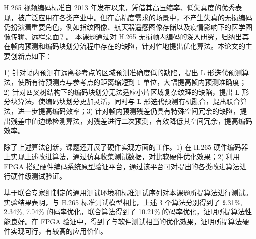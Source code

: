 \begin{cabstract}
    H.265 视频编码标准自 2013 年发布以来，凭借其高压缩率、低失真度的优秀表现，被广泛应用在各类产业中。但在高精度需求的场景中，不产生失真的无损编码仍扮演着重要角色，例如指纹图像、航天器遥感图像存储以及疫情影响下的医学图像传输、远程桌面等。    
    本课题通过对 H.265 无损帧内编码的深入研究，归纳出其在帧内预测和编码块划分流程中存在的缺陷，针对性地提出优化算法。本论文的主要创新点如下：

    1) 针对帧内预测在远离参考点的区域预测准确度低的缺陷，提出 L 形迭代预测算法，使所有待预测点与参考点的距离缩短到 1 单位，大幅提高帧内预测准确度；2) 针对四叉树结构下的编码块划分无法适应小片区域复杂纹理的缺陷，提出 L 形分块算法，使编码块划分更加灵活，同时与 L 形迭代预测有机融合，提出联合算法，进一步提高编码效率；3) 针对帧内预测残差仍具有特殊空间冗余的缺陷，提出残差中值边缘检测算法，对残差进行二次预测，有效降低其空间冗余，提高编码效率。

    除了上述算法创新，课题还开展了硬件实现方面的工作。1) 在 H.265 硬件编码器上实现上述改进算法，通过仿真收集测试数据，对比软硬件优化效果；2) 利用 FPGA 搭建硬件编码系统原型验证平台，通过该平台可对提出的各类改进算法进行硬件级测试验证。

    基于联合专家组制定的通用测试环境和标准测试序列对本课题所提算法进行测试。实验结果表明，与 H.265 标准测试模型相比，上述 3 个算法分别得到了 9.31\%, 2.34\%, 7.04\% 的码率优化，联合算法得到了 10.21\% 的码率优化，证明所提算法性能良好。在 FPGA 验证中，得到了与软件测试相当的优化效果，证明所提算法硬件实现可行，有较高的应用价值。
\end{cabstract}


